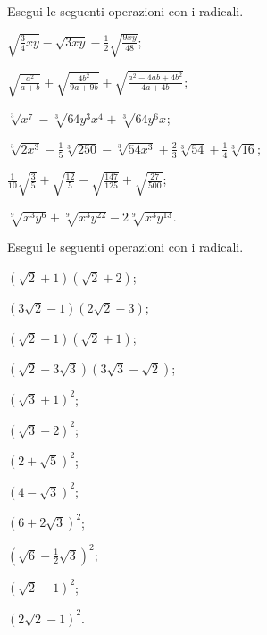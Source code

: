 \begin{esercizio}[\Ast]
 \label{ese:2.68}
Esegui le seguenti operazioni con i radicali.
 \begin{enumeratea}
 \item $\sqrt{\frac{3}{4}xy}-\sqrt{3xy}-\frac{1}{2}\sqrt{\frac{9xy}{48}}$;
 \item $\sqrt{\frac{a^{2}}{a+b}}+\sqrt{\frac{4b^{2}}{9a+9b}}+\sqrt{\frac{a^{2}-4ab+4b^{2}}{4a+4b}}$;
 \item $\sqrt[3]{x^{7}}-\sqrt[3]{64y^{3}x^{4}}+\sqrt[3]{64y^{6}x}$;
 \item $\sqrt[3]{2x^{3}}-\frac{1}{5}\sqrt[3]{250}-\sqrt[3]{54x^{3}}+\frac{2}{3}\sqrt[3]{54}+\frac{1}{4}\sqrt[3]{16}$;
 \item $\frac{1}{10}\sqrt{\frac{3}{5}}+\sqrt{\frac{12}{5}}-\sqrt{\frac{147}{125}}+\sqrt{\frac{27}{500}}$;
 \item $\sqrt[9]{x^{3}y^{6}}+\sqrt[9]{x^{3}y^{22}}-2\sqrt[9]{x^{3}y^{13}}$.
 \end{enumeratea}
\end{esercizio}

\begin{esercizio}[\Ast]
 \label{ese:2.69}
Esegui le seguenti operazioni con i radicali.
 \begin{multicols}{3}
 \begin{enumeratea}
 \item $(\sqrt 2+1)(\sqrt 2+2)$;
 \item $(3\sqrt 2-1)(2\sqrt 2-3)$;
 \item $(\sqrt 2-1)(\sqrt 2+1)$;
 \item $(\sqrt 2-3\sqrt 3)(3\sqrt 3-\sqrt 2)$;
 \item $(\sqrt 3+1)^2$;
 \item $(\sqrt 3-2)^2$;
 \item $(2+\sqrt 5)^2$;
 \item $(4-\sqrt 3)^2$;
 \item $(6+2\sqrt 3)^2$;
 \item $(\sqrt 6-\frac 1 2\sqrt 3)^2$;
 \item $(\sqrt 2-1)^2$;
 \item $(2\sqrt 2-1)^2$.
 \end{enumeratea}
 \end{multicols}
\end{esercizio}

